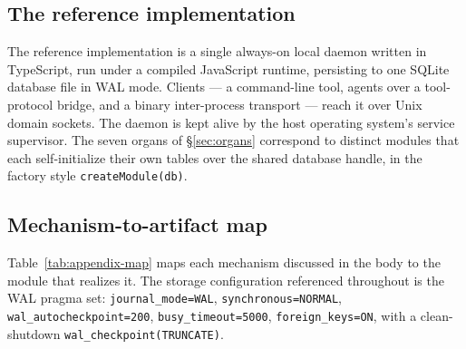 \documentclass[11pt,a4paper]{article}
\theoremstyle{definition}
\theoremstyle{remark}
\begin{document}
\subsection{The reference implementation}

The reference implementation is a single always-on local daemon written in
TypeScript, run under a compiled JavaScript runtime, persisting to one SQLite
database file in WAL mode. Clients --- a command-line tool, agents over a
tool-protocol bridge, and a binary inter-process transport --- reach it over Unix
domain sockets. The daemon is kept alive by the host operating system's service
supervisor. The seven organs of \S\ref{sec:organs} correspond to distinct modules
that each self-initialize their own tables over the shared database handle, in the
factory style \texttt{createModule(db)}.

\subsection{Mechanism-to-artifact map}

Table~\ref{tab:appendix-map} maps each mechanism discussed in the body to the
module that realizes it. The storage configuration referenced throughout is the WAL
pragma set: \texttt{journal\_mode=WAL}, \texttt{synchronous=NORMAL},
\texttt{wal\_autocheckpoint=200}, \texttt{busy\_timeout=5000},
\texttt{foreign\_keys=ON}, with a clean-shutdown \texttt{wal\_checkpoint(TRUNCATE)}.
\end{document}

